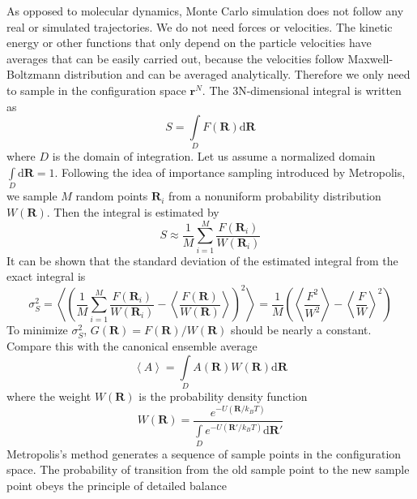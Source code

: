 \documentclass[letterpaper,12pt]{article}
\numberwithin{equation}{section}
\begin{document}
As opposed to molecular dynamics, Monte Carlo simulation does not follow any real or simulated trajectories. We do not need forces or velocities. The kinetic energy or other functions that only depend on the particle velocities have averages that can be easily carried out, because the velocities follow Maxwell-Boltzmann distribution and can be averaged analytically. Therefore we only need to sample in the configuration space $\boldsymbol{r}^N$. The 3N-dimensional integral is written as 
\begin{equation}
    S=\int\limits_D{F(\boldsymbol{R})\mathrm{d}\boldsymbol{R}}
\end{equation}
where $D$ is the domain of integration. Let us assume a normalized domain $\int\limits_D{\mathrm{d}\boldsymbol{R}}=1$. Following the idea of importance sampling introduced by Metropolis, we sample $M$ random points $\boldsymbol{R}_i$ from a nonuniform probability distribution $W(\boldsymbol{R})$\cite{Comp}. Then the integral is estimated by 
\begin{equation}
    S\approx \frac{1}{M}\sum\limits_{i=1}^M\frac{F(\boldsymbol{R}_i)}{W(\boldsymbol{R}_i)}
\end{equation}
It can be shown that the standard deviation of the estimated integral from the exact integral is 
\begin{equation}
    \sigma_S^2=\left\langle\left(\frac{1}{M}\sum\limits_{i=1}^M\frac{F(\boldsymbol{R}_i)}{W(\boldsymbol{R}_i)}-\left\langle\frac{F(\boldsymbol{R})}{W(\boldsymbol{R})}\right\rangle\right)^2\right\rangle=\frac{1}{M}\left(\left\langle\frac{F^2}{W^2}\right\rangle-\left\langle\frac{F}{W}\right\rangle^2\right)
\end{equation}
To minimize $\sigma_S^2$, $G(\boldsymbol{R})=F(\boldsymbol{R})/W(\boldsymbol{R})$ should be nearly a constant. Compare this with the canonical ensemble average
\begin{equation}
    \left\langle A\right\rangle=\int\limits_{D}{A(\boldsymbol{R})W(\boldsymbol{R})\mathrm{d}\boldsymbol{R}}
\end{equation}
where the weight $W(\boldsymbol{R})$ is the probability density function
\begin{equation}
    W(\boldsymbol{R})=\frac{e^{-U(\boldsymbol{R}/k_BT)}}{\int\limits_D{e^{-U(\boldsymbol{R}'/k_BT)}\mathrm{d}\boldsymbol{R}'}}
\end{equation}
Metropolis's method generates a sequence of sample points in the configuration space. The probability of transition from the old sample point to the new sample point obeys the principle of detailed balance 
\end{document}
